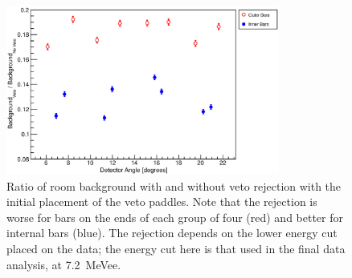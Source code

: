 \begin{figure}[!htbp]
\centering
\includegraphics[width=0.8\textwidth]{figures/bkgdRejection_old_legend.eps}
\caption[Improvement in background rejection due to initial veto setup.]{Ratio of room background with and without veto rejection with the initial placement of the veto paddles.  Note that the rejection is worse for bars on the ends of each group of four (red) and better for internal bars (blue).  The rejection depends on the lower energy cut placed on the data; the energy cut here is that used in the final data analysis, at 7.2~MeVee.}
\label{fig:initialBackground}
\end{figure}

